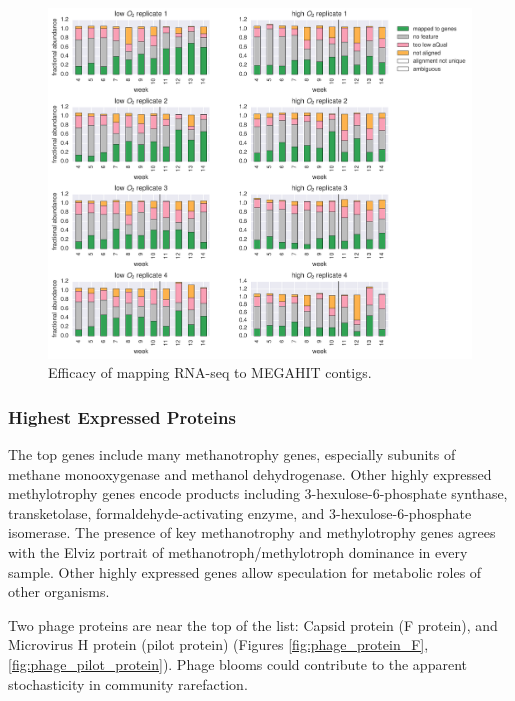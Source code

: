 \begin{figure}[H]
\centering
    \includegraphics[width=1.0\textwidth]{./tex/chapter2/figures/170316_fracs_mapped_unmapped_etc.pdf}
    \begin{singlespace}
    \caption[Efficacy of mapping RNA-seq to MEGAHIT contigs]{
        Efficacy of mapping RNA-seq to MEGAHIT contigs.}
    \label{fig:rna_mapping_bars}
    \end{singlespace}
\end{figure}

\subsubsection{Highest Expressed Proteins}

The top genes include many methanotrophy genes, especially subunits of methane monooxygenase and methanol dehydrogenase.
Other highly expressed methylotrophy genes encode products including 3-hexulose-6-phosphate synthase, transketolase, formaldehyde-activating enzyme, and 3-hexulose-6-phosphate isomerase.
The presence of key methanotrophy and methylotrophy genes agrees with the Elviz portrait of methanotroph/methylotroph dominance in every sample.
Other highly expressed genes allow speculation for metabolic roles of other organisms.

Two phage proteins are near the top of the list: Capsid protein (F protein), and Microvirus H protein (pilot protein) (Figures \ref{fig:phage_protein_F}, \ref{fig:phage_pilot_protein}). %
Phage blooms could contribute to the apparent stochasticity in community rarefaction.

